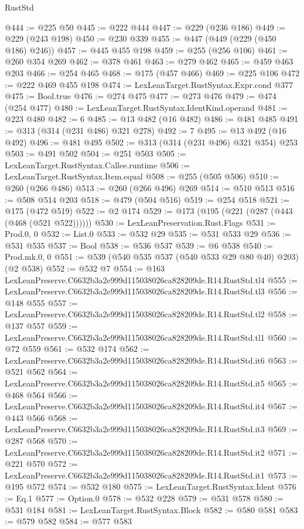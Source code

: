 \begin{lexlean}{RustStd}
\begin{coremodule}
@444 := @225 @50
@445 := @222 @444
@447 := @229 (@236 @186)
@449 := @229 (@243 @198)
@450 := @230 @339
@455 := @447 (@449 (@229 (@450 @186) @246))
@457 := @445 @455 @198
@459 := @255 (@256 @106)
@461 := @260 @354 @269
@462 := @378 @461
@463 := @279 @462
@465 := @459 @463 @203
@466 := @254 @465
@468 := @175 (@457 @466)
@469 := @225 @106
@472 := @222 @469 @455 @198
@474 := LexLeanTarget.RustSyntax.Expr.cond @377
@475 := Bool.true
@476 := @274 @475
@477 := @273 @476
@479 := @474 (@254 @477)
@480 := LexLeanTarget.RustSyntax.IdentKind.operand
@481 := @223 @480
@482 := 6
@485 := @13 @482 (@16 @482)
@486 := @481 @485
@491 := @313 (@314 (@231 @486) @321 @278)
@492 := 7
@495 := @13 @492 (@16 @492)
@496 := @481 @495
@502 := @313 (@314 (@231 @496) @321 @354) @253
@503 := @491 @502
@504 := @251 @503
@505 := LexLeanTarget.RustSyntax.Callee.runtime
@506 := LexLeanTarget.RustSyntax.Item.equal
@508 := @255 (@505 @506)
@510 := @260 (@266 @486)
@513 := @260 (@266 @496) @269
@514 := @510 @513
@516 := @508 @514 @203
@518 := @479 (@504 @516)
@519 := @254 @518
@521 := @175 (@472 @519)
@522 := @2 @174
@529 := @173 (@195 (@221 (@287 (@443 (@468 (@521 @522))))))
@530 := LexLeanPreservation.Rust.Flags
@531 := Prod.{0, 0}
@532 := List.{0}
@533 := @532 @29
@535 := @531 @533 @29
@536 := @531 @535
@537 := Bool
@538 := @536 @537
@539 := @6 @538
@540 := Prod.mk.{0, 0}
@551 := @539 (@540 @535 @537 (@540 @533 @29 @80 @40) @203) (@2 @538)
@552 := @532 @7
@554 := @163 LexLeanPreserve.C6632b3a2e999d115038026ca828209de.R14.RustStd.tl4
@555 := LexLeanPreserve.C6632b3a2e999d115038026ca828209de.R14.RustStd.tl3
@556 := @148 @555
@557 := LexLeanPreserve.C6632b3a2e999d115038026ca828209de.R14.RustStd.tl2
@558 := @137 @557
@559 := LexLeanPreserve.C6632b3a2e999d115038026ca828209de.R14.RustStd.tl1
@560 := @72 @559
@561 := @532 @174
@562 := LexLeanPreserve.C6632b3a2e999d115038026ca828209de.R14.RustStd.it6
@563 := @521 @562
@564 := LexLeanPreserve.C6632b3a2e999d115038026ca828209de.R14.RustStd.it5
@565 := @468 @564
@566 := LexLeanPreserve.C6632b3a2e999d115038026ca828209de.R14.RustStd.it4
@567 := @443 @566
@568 := LexLeanPreserve.C6632b3a2e999d115038026ca828209de.R14.RustStd.it3
@569 := @287 @568
@570 := LexLeanPreserve.C6632b3a2e999d115038026ca828209de.R14.RustStd.it2
@571 := @221 @570
@572 := LexLeanPreserve.C6632b3a2e999d115038026ca828209de.R14.RustStd.it1
@573 := @195 @572
@574 := @532 @180
@575 := LexLeanTarget.RustSyntax.Ident
@576 := Eq.{1}
@577 := Option.{0}
@578 := @532 @228
@579 := @531 @578
@580 := @531 @184
@581 := LexLeanTarget.RustSyntax.Block
@582 := @580 @581
@583 := @579 @582
@584 := @577 @583

\end{coremodule}
\end{lexlean}
